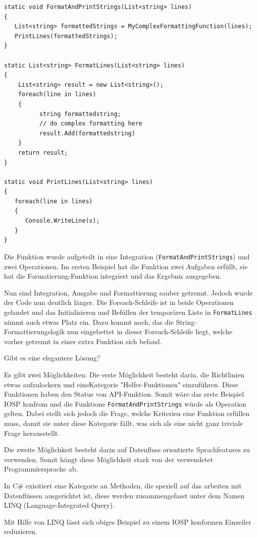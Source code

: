 \documentclass[11pt]{article}
\begin{document}
\begin{verbatim}
static void FormatAndPrintStrings(List<string> lines)
{
   List<string> formattedStrings = MyComplexFormattingFunction(lines);
   PrintLines(formattedStrings);
}

static List<string> FormatLines(List<string> lines)
{
    List<string> result = new List<string>();
    foreach(line in lines)
    {
          string formattedstring;
          // do complex formatting here
          result.Add(formattedstring) 
    }
    return result;
}

static void PrintLines(List<string> lines)
{
   foreach(line in lines)
   {
      Console.WriteLine(s);
   }
}
\end{verbatim}

Die Funktion wurde aufgeteilt in eine Integration (\texttt{FormatAndPrintStrings}) und zwei Operationen.
Im ersten Beispiel hat die Funktion zwei Aufgaben erfüllt, sie hat die Formatierung-Funktion integriert und 
das Ergebnis ausgegeben.

Nun sind Integration, Ausgabe und Formattierung sauber getrennt.
Jedoch wurde der Code nun deutlich länger. Die Foreach-Schleife ist in beide Operationen gelandet und das Initialisieren und
Befüllen der temporären Liste in \texttt{FormatLines} nimmt auch etwas Platz ein.
Dazu kommt noch, das die String-Formattierungslogik nun eingebettet in dieser Foreach-Schleife liegt, welche vorher getrennt in
einer extra Funktion sich befand. 

Gibt es eine elegantere Lösung?

Es gibt zwei Möglichkeiten: Die erste Möglichkeit besteht darin, die Richtlinien etwas aufzulockern und eineKategorie "Helfer-Funktionen" einzuführen.
Diese Funktionen haben den Status von API-Funktion. Somit wäre das erste Beispiel IOSP konfrom und die Funktione \texttt{FormatAndPrintStrings}
würde als Operation gelten.
Dabei stellt sich jedoch die Frage, welche Kriterien eine Funktion erfüllen muss, damit sie unter diese Kategorie 
fällt, was sich als eine nicht ganz triviale Frage herausstellt.

Die zweite Möglichkeit besteht darin auf Datenfluss orientierte Sprachfeatures zu verwenden.
Somit hängt diese Möglichkeit stark von der verwendetet Programmiersprache ab.

In C\# exisitiert eine Kategorie an Methoden, die speziell auf das arbeiten mit Datenflüssen ausgerichtet ist, diese werden 
zusammengefasst unter dem Namen LINQ (Language-Integrated Query).

Mit Hilfe von LINQ lässt sich obiges Beispiel zu einem IOSP konformen Einzeiler reduzieren.
\end{document}
